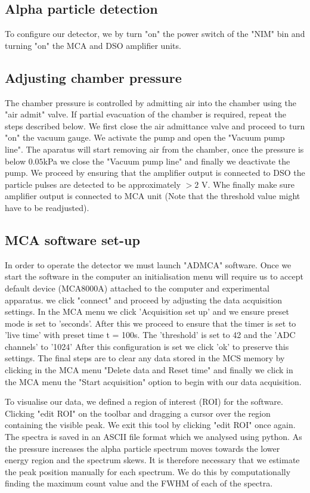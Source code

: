 \documentclass[a4paper]{article}
\begin{document}
\begin{multicols}{2}
\subsection{Alpha particle detection}
To configure our detector, we by turn "on" the power switch of the "NIM" bin and turning "on" the MCA and DSO amplifier units.
\subsection{Adjusting chamber pressure}
The chamber pressure is controlled by admitting air into the chamber using the "air admit" valve. If partial evacuation of the chamber is required, repeat the steps described below.
We first close the air admittance valve and proceed to turn "on" the vacuum gauge. We activate the pump and open the "Vacuum pump line". The aparatus will start removing air from the chamber, once the pressure is below $0.05$kPa we close the "Vacuum pump line" and finally we deactivate the pump. 
We proceed by ensuring that the amplifier output is connected to DSO the particle pulses are detected to be approximately $> 2$ V. Whe finally make sure amplifier output is connected to MCA unit
(Note that the threshold value might have to be readjusted).

\subsection{MCA software set-up}
In order to operate the detector we must launch "ADMCA" software. Once we start the software in the computer an initialisation menu will require us to accept default device (MCA8000A) attached to the computer and experimental apparatus. we click "connect" and proceed by adjusting the data acquisition settings.
In the MCA menu we click 'Acquisition set up' and we ensure preset mode is set to 'seconds'. After this we proceed to ensure that the timer is set to 'live time' with preset time t = 100s.
The 'threshold' is set to 42 and the 'ADC channels' to '1024'
After this configuration is set we click 'ok' to preserve this settings.
The final steps are to clear any data stored in the MCS memory by clicking in the MCA menu "Delete data and Reset time" and finally we 
click in the MCA menu the "Start acquisition" option to begin with our data acquisition.

To visualise our data, we defined a region of interest (ROI) for the software. Clicking "edit ROI" on the toolbar and dragging a cursor over the region containing the visible peak. We exit this tool by clicking "edit ROI" once again. The spectra is saved in an ASCII file format which we analysed using python.
As the pressure increases the alpha particle spectrum moves towards the lower energy region and the spectrum skews.
It is therefore necessary that we estimate the peak position manually for each spectrum. We do this by computationally finding the maximum count value and the FWHM of each of the spectra.


\end{multicols}
\end{document}
